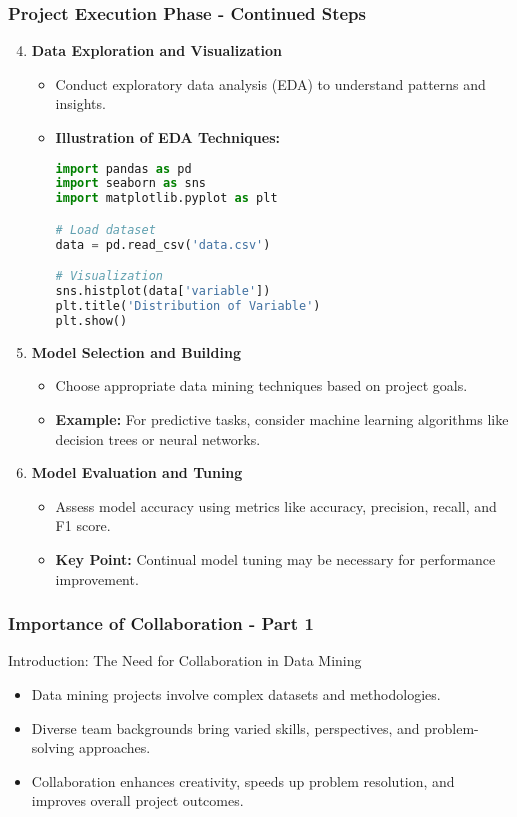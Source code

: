 \documentclass[aspectratio=169]{beamer}
\begin{document}
\begin{frame}[fragile]
    \frametitle{Project Execution Phase - Continued Steps}
    \begin{enumerate}
        \setcounter{enumi}{3} %
        \item \textbf{Data Exploration and Visualization}
            \begin{itemize}
                \item Conduct exploratory data analysis (EDA) to understand patterns and insights.
                \item \textbf{Illustration of EDA Techniques:}
                    \begin{lstlisting}[language=Python]
import pandas as pd
import seaborn as sns
import matplotlib.pyplot as plt

# Load dataset
data = pd.read_csv('data.csv')

# Visualization
sns.histplot(data['variable'])
plt.title('Distribution of Variable')
plt.show()
                    \end{lstlisting}
            \end{itemize}
        \item \textbf{Model Selection and Building}
            \begin{itemize}
                \item Choose appropriate data mining techniques based on project goals.
                \item \textbf{Example:} For predictive tasks, consider machine learning algorithms like decision trees or neural networks.
            \end{itemize}
        \item \textbf{Model Evaluation and Tuning}
            \begin{itemize}
                \item Assess model accuracy using metrics like accuracy, precision, recall, and F1 score.
                \item \textbf{Key Point:} Continual model tuning may be necessary for performance improvement.
            \end{itemize}
    \end{enumerate}
\end{frame}

\begin{frame}[fragile]
    \frametitle{Importance of Collaboration - Part 1}
    \begin{block}{Introduction: The Need for Collaboration in Data Mining}
        \begin{itemize}
            \item Data mining projects involve complex datasets and methodologies.
            \item Diverse team backgrounds bring varied skills, perspectives, and problem-solving approaches.
            \item Collaboration enhances creativity, speeds up problem resolution, and improves overall project outcomes.
        \end{itemize}
    \end{block}
\end{frame}
\end{document}
